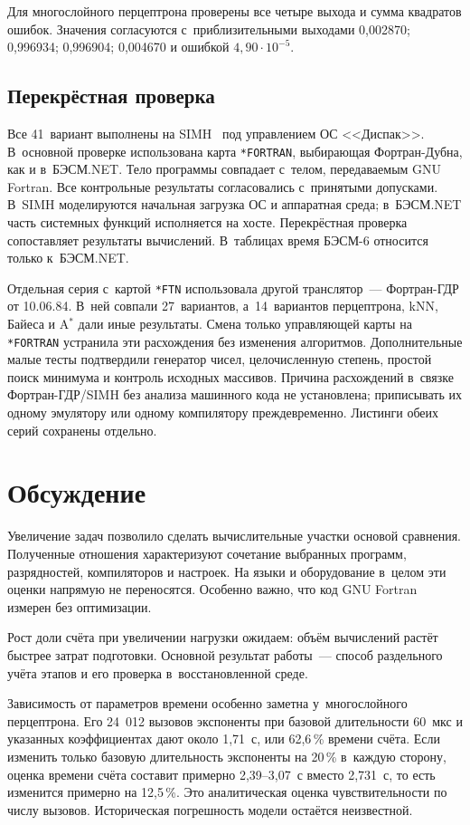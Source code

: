 \documentclass[a4paper,12pt]{article}
\begin{document}
Для многослойного перцептрона проверены все четыре выхода и сумма квадратов ошибок. Значения согласуются с~приблизительными выходами 0,002870; 0,996934; 0,996904; 0,004670 и ошибкой $4{,}90\cdot10^{-5}$.

\subsection{Перекрёстная проверка}

Все 41~вариант выполнены на SIMH~\cite{simh} под управлением ОС <<Диспак>>. В~основной проверке использована карта \texttt{*FORTRAN}, выбирающая Фортран-Дубна, как и в~БЭСМ.NET. Тело программы совпадает с~телом, передаваемым GNU Fortran. Все контрольные результаты согласовались с~принятыми допусками. В~SIMH моделируются начальная загрузка ОС и аппаратная среда; в~БЭСМ.NET часть системных функций исполняется на хосте. Перекрёстная проверка сопоставляет результаты вычислений. В~таблицах время БЭСМ-6 относится только к~БЭСМ.NET.

Отдельная серия с~картой \texttt{*FTN} использовала другой транслятор~--- Фортран-ГДР от 10.06.84. В~ней совпали 27~вариантов, а~14~вариантов перцептрона, kNN, Байеса и A$^*$ дали иные результаты. Смена только управляющей карты на \texttt{*FORTRAN} устранила эти расхождения без изменения алгоритмов. Дополнительные малые тесты подтвердили генератор чисел, целочисленную степень, простой поиск минимума и контроль исходных массивов. Причина расхождений в~связке Фортран-ГДР/SIMH без анализа машинного кода не установлена; приписывать их одному эмулятору или одному компилятору преждевременно. Листинги обеих серий сохранены отдельно.

\section{Обсуждение}
\label{sec:discussion}

Увеличение задач позволило сделать вычислительные участки основой сравнения. Полученные отношения характеризуют сочетание выбранных программ, разрядностей, компиляторов и настроек. На языки и оборудование в~целом эти оценки напрямую не переносятся. Особенно важно, что код GNU Fortran измерен без оптимизации.

Рост доли счёта при увеличении нагрузки ожидаем: объём вычислений растёт быстрее затрат подготовки. Основной результат работы~--- способ раздельного учёта этапов и его проверка в~восстановленной среде.

Зависимость от параметров времени особенно заметна у~многослойного перцептрона. Его 24~012 вызовов экспоненты при базовой длительности 60~мкс и указанных коэффициентах дают около 1,71~с, или 62,6\,\% времени счёта. Если изменить только базовую длительность экспоненты на 20\,\% в~каждую сторону, оценка времени счёта составит примерно 2,39--3,07~с вместо 2,731~с, то есть изменится примерно на 12,5\,\%. Это аналитическая оценка чувствительности по числу вызовов. Историческая погрешность модели остаётся неизвестной.
\end{document}
